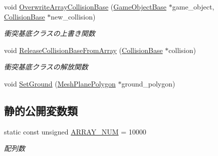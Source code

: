 \begin{DoxyCompactItemize}
void \mbox{\hyperlink{class_collision_manager_af9c2ce87e0189cdd1256c83decc64673}{Overwrite\+Array\+Collision\+Base}} (\mbox{\hyperlink{class_game_object_base}{Game\+Object\+Base}} $\ast$game\+\_\+object, \mbox{\hyperlink{class_collision_base}{Collision\+Base}} $\ast$new\+\_\+collision)
\begin{DoxyCompactList}\small\item\em 衝突基底クラスの上書き関数 \end{DoxyCompactList}\item 
void \mbox{\hyperlink{class_collision_manager_a34318163f4256cebc7aefb95fc475030}{Release\+Collision\+Base\+From\+Array}} (\mbox{\hyperlink{class_collision_base}{Collision\+Base}} $\ast$collision)
\begin{DoxyCompactList}\small\item\em 衝突基底クラスの解放関数 \end{DoxyCompactList}\item 
void \mbox{\hyperlink{class_collision_manager_a63ce6003d8d042085d7b388a4cfa0666}{Set\+Ground}} (\mbox{\hyperlink{class_mesh_plane_polygon}{Mesh\+Plane\+Polygon}} $\ast$ground\+\_\+polygon)
\end{DoxyCompactItemize}
\subsection*{静的公開変数類}
\begin{DoxyCompactItemize}
\item 
static const unsigned \mbox{\hyperlink{class_collision_manager_addbc64e1fa0b01f3be07c897887f44ec}{A\+R\+R\+A\+Y\+\_\+\+N\+UM}} = 10000
\begin{DoxyCompactList}\small\item\em 配列数 \end{DoxyCompactList}\end{DoxyCompactItemize}
